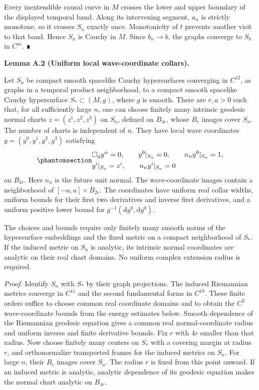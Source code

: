 \documentclass[
  english,
  11pt,
  reqno]{amsart}
\makeatletter
\newcommand{\pandocstatementheading}[1]{%
  \par\addpenalty{\@beginparpenalty}%
  \addvspace{.5\baselineskip plus .2\baselineskip minus .2\baselineskip}%
  {\normalfont\bfseries #1\par}%
  \nobreak\@afterindenttrue\@afterheading
}
\makeatother
\begin{document}
Every inextendible causal curve in \(M\) crosses the lower and upper
boundary of the displayed temporal band. Along its intervening segment,
\(a_n\) is strictly monotone, so it crosses \(S_n\) exactly once.
Monotonicity of \(t\) prevents another visit to that band. Hence \(S_n\)
is Cauchy in \(M\). Since \(b_n\to b\), the graphs converge to \(S_b\)
in \(C^m\). ∎

\pandocstatementheading{\protect{}\label{lem:uniform-local-wave-coordinate-collars}Lemma A.2 (Uniform local wave-coordinate collars).}

Let \(S_n\) be compact smooth spacelike Cauchy hypersurfaces converging
in \(C^{12}\), as graphs in a temporal product neighborhood, to a
compact smooth spacelike Cauchy hypersurface \(S_*\subset(M,g)\), where
\(g\) is smooth. There are \(r,a>0\) such that, for all sufficiently
large \(n\), one can choose finitely many intrinsic geodesic normal
charts \(z=(z^1,z^2,z^3)\) on \(S_n\), defined on \(B_{4r}\), whose
\(B_r\) images cover \(S_n\). The number of charts is independent of
\(n\). They have local wave coordinates \(y=(y^0,y^1,y^2,y^3)\)
satisfying
\begin{equation}\protect\phantomsection\label{eq:analytic-persistence-wave-coordinate-data}{
\begin{aligned}
&\Box_g y^\alpha=0,\qquad y^0|_{S_n}=0,
\qquad n_n y^0|_{S_n}=1,\\
&y^i|_{S_n}=z^i,\qquad n_n y^i|_{S_n}=0
\end{aligned}
}\end{equation} on \(B_{3r}\). Here \(n_n\) is the future unit normal.
The wave-coordinate images contain a neighborhood of
\([-a,a]\times\overline B_{2r}\). The coordinates have uniform real
collar widths, uniform bounds for their first two derivatives and
inverse first derivatives, and a uniform positive lower bound for
\(g^{-1}(\mathrm dy^0,\mathrm dy^0)\).

The choices and bounds require only finitely many smooth norms of the
hypersurface embeddings and the fixed metric on a compact neighborhood
of \(S_*\). If the induced metric on \(S_n\) is analytic, its intrinsic
normal coordinates are analytic on their real chart domains. No uniform
complex extension radius is required.

\emph{Proof.} Identify \(S_n\) with \(S_*\) by their graph projections.
The induced Riemannian metrics converge in \(C^{11}\) and the second
fundamental forms in \(C^{10}\). These finite orders suffice to choose
common real coordinate domains and to obtain the \(C^2\) wave-coordinate
bounds from the energy estimates below. Smooth dependence of the
Riemannian geodesic equation gives a common real normal-coordinate
radius and uniform inverse and finite derivative bounds. Fix \(r\) with
\(4r\) smaller than that radius. Now choose finitely many centers on
\(S_*\) with a covering margin at radius \(r\), and orthonormalize
transported frames for the induced metrics on \(S_n\). For large \(n\),
their \(B_r\) images cover \(S_n\). The radius \(r\) is fixed from this
point onward. If an induced metric is analytic, analytic dependence of
its geodesic equation makes the normal chart analytic on \(B_{4r}\).
\end{document}
